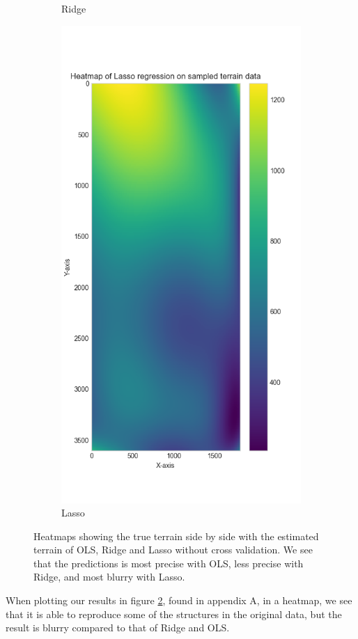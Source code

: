 \begin{figure}[H]
\begin{subfigure}[h]{0.23\textwidth}
         \caption{Ridge}
         \label{fig:ridge heatmap}
     \end{subfigure}
     \hfill
     \begin{subfigure}[h]{0.23\textwidth}
         \centering
         \includegraphics[width=\textwidth]{Images/lasso_terrain_heatmap.png}
         \caption{Lasso}
         \label{fig:lasso heatmap}
     \end{subfigure}
        \caption{Heatmaps showing the true terrain side by side with the estimated terrain of OLS, Ridge and Lasso without cross validation. We see that the predictions is most precise with OLS, less precise with Ridge, and most blurry with Lasso.}
        \label{fig:four graphs}
\end{figure}


When plotting our results in figure \ref{fig:lasso heatmap}, found in appendix A, in a heatmap, we see that it is able to reproduce some of the structures in the original data, but the result is blurry compared to that of Ridge and OLS. 